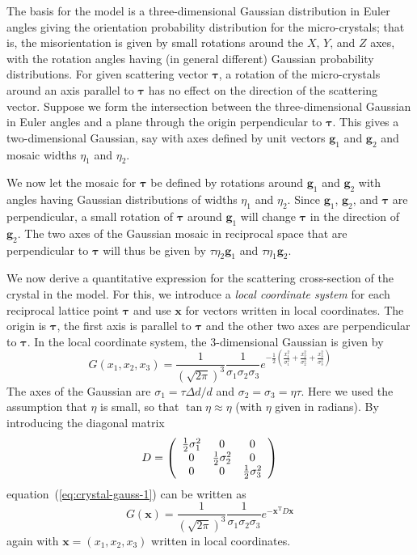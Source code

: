 The basis for the model is a three-dimensional Gaussian distribution in
Euler angles giving the orientation probability distribution for the
micro-crystals; that is, the misorientation is given by small rotations
around the $X$, $Y$, and $Z$ axes, with the rotation angles having (in
general different) Gaussian probability distributions. For given
scattering vector $\boldsymbol{\tau}$, a rotation of the micro-crystals
around an axis parallel to $\boldsymbol{\tau}$ has no effect on the
direction of the scattering vector. Suppose we form the intersection
between the three-dimensional Gaussian in Euler angles and a plane
through the origin perpendicular to $\boldsymbol{\tau}$. This gives a
two-dimensional Gaussian, say with axes defined by unit vectors
$\boldsymbol{g}_1$ and $\boldsymbol{g}_2$ and mosaic widths $\eta_1$ and
$\eta_2$.

We now let the mosaic for $\boldsymbol{\tau}$ be defined by rotations
around $\boldsymbol{g}_1$ and $\boldsymbol{g}_2$ with angles having
Gaussian distributions of widths $\eta_1$ and $\eta_2$. Since
$\boldsymbol{g}_1$, $\boldsymbol{g}_2$, and $\boldsymbol{\tau}$ are
perpendicular, a small rotation of $\boldsymbol{\tau}$ around
$\boldsymbol{g}_1$ will change $\boldsymbol{\tau}$ in the direction of
$\boldsymbol{g}_2$. The two axes of the Gaussian mosaic in reciprocal
space that are perpendicular to $\boldsymbol{\tau}$ will thus be given
by $\tau\eta_2\boldsymbol{g}_1$ and $\tau\eta_1\boldsymbol{g}_2$.

We now derive a quantitative expression for the scattering cross-section
of the crystal in the model. For this, we introduce a \emph{local
  coordinate system} for each reciprocal lattice point
$\boldsymbol{\tau}$ and use $\boldsymbol{x}$ for vectors written in local
coordinates. The origin is $\boldsymbol{\tau}$, the first axis
is parallel to $\boldsymbol{\tau}$ and the other two axes are
perpendicular to $\boldsymbol{\tau}$. In the local coordinate system,
the 3-dimensional Gaussian is given by
\begin{equation}
  \label{eq:crystal-gauss-1}
  G(x_1,x_2,x_3) = \frac{1}{(\sqrt{2\pi})^3}\frac{1}{\sigma_1\sigma_2\sigma_3}
  e^{-\frac{1}{2}(\frac{x_1^2}{\sigma_1^2} +
  \frac{x_2^2}{\sigma_2^2} + \frac{x_3^2}{\sigma_3^2})}
\end{equation}
The axes of the Gaussian are $\sigma_1 = \tau\Delta d/d$ and $\sigma_2 =
\sigma_3 = \eta\tau$. Here we used the assumption that $\eta$ is small,
so that $\tan\eta \approx \eta$ (with $\eta$ given in radians).  By
introducing the diagonal matrix
$$
D = \left(
  \begin{array}[c]{ccc}
    \frac{1}{2}\sigma_1^2 & 0 & 0 \\
    0 & \frac{1}{2}\sigma_2^2 & 0 \\
    0 & 0 & \frac{1}{2}\sigma_3^2
  \end{array}\right)
$$
equation~(\ref{eq:crystal-gauss-1}) can be written as
\begin{equation}
  G(\boldsymbol{x}) =
  \frac{1}{(\sqrt{2\pi})^3}\frac{1}{\sigma_1\sigma_2\sigma_3}
  e^{-\boldsymbol{x}^\textrm{T} D \boldsymbol{x}}
\end{equation}
again with $\boldsymbol{x}=(x_1,x_2,x_3)$ written in local coordinates.

